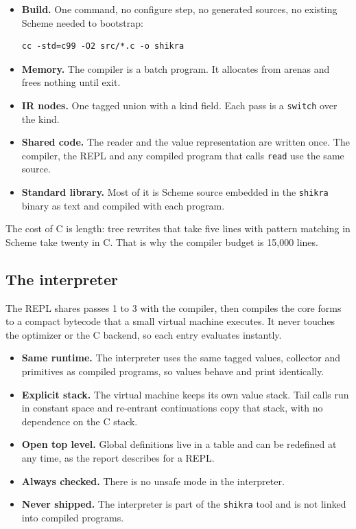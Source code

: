 \documentclass[a4paper,11pt]{article}
\begin{document}
\begin{itemize}
\item \textbf{Build.} One command, no configure step, no generated sources,
  no existing Scheme needed to bootstrap:
\begin{verbatim}
cc -std=c99 -O2 src/*.c -o shikra
\end{verbatim}
\item \textbf{Memory.} The compiler is a batch program. It allocates from
  arenas and frees nothing until exit.
\item \textbf{IR nodes.} One tagged union with a kind field. Each pass is a
  \texttt{switch} over the kind.
\item \textbf{Shared code.} The reader and the value representation are
  written once. The compiler, the REPL and any compiled program that calls
  \texttt{read} use the same source.
\item \textbf{Standard library.} Most of it is Scheme source embedded in the
  \texttt{shikra} binary as text and compiled with each program.
\end{itemize}

The cost of C is length: tree rewrites that take five lines with pattern
matching in Scheme take twenty in C. That is why the compiler budget is
15,000 lines.

\subsection{The interpreter}

The REPL shares passes 1 to 3 with the compiler, then compiles the core
forms to a compact bytecode that a small virtual machine executes. It never
touches the optimizer or the C backend, so each entry evaluates instantly.

\begin{itemize}
\item \textbf{Same runtime.} The interpreter uses the same tagged values,
  collector and primitives as compiled programs, so values behave and print
  identically.
\item \textbf{Explicit stack.} The virtual machine keeps its own value
  stack. Tail calls run in constant space and re-entrant continuations copy
  that stack, with no dependence on the C stack.
\item \textbf{Open top level.} Global definitions live in a table and can be
  redefined at any time, as the report describes for a REPL.
\item \textbf{Always checked.} There is no unsafe mode in the interpreter.
\item \textbf{Never shipped.} The interpreter is part of the \texttt{shikra}
  tool and is not linked into compiled programs.
\end{itemize}
\end{document}
